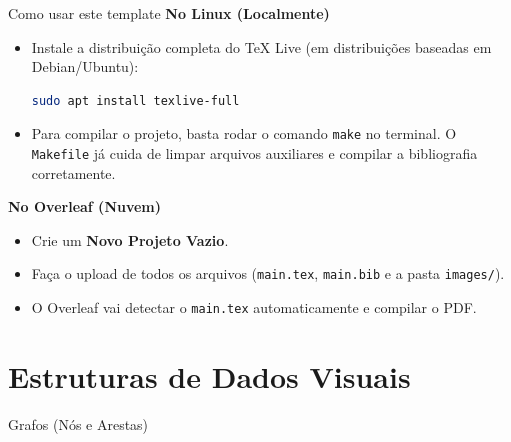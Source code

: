 \documentclass[utf8, aspectratio=169]{beamer}
\begin{document}
\begin{frame}[fragile]{Como usar este template}
  \textbf{No Linux (Localmente)}
  \begin{itemize}
    \item Instale a distribuição completa do TeX Live (em distribuições baseadas em Debian/Ubuntu):
    \begin{lstlisting}[language=bash, numbers=none, xleftmargin=0em, framexleftmargin=0em]
sudo apt install texlive-full
    \end{lstlisting}
    \item Para compilar o projeto, basta rodar o comando \texttt{make} no terminal. O \texttt{Makefile} já cuida de limpar arquivos auxiliares e compilar a bibliografia corretamente.
  \end{itemize}

  \vspace{0.3cm}
  \textbf{No Overleaf (Nuvem)}
  \begin{itemize}
    \item Crie um \textbf{Novo Projeto Vazio}.
    \item Faça o upload de todos os arquivos (\texttt{main.tex}, \texttt{main.bib} e a pasta \texttt{images/}).
    \item O Overleaf vai detectar o \texttt{main.tex} automaticamente e compilar o PDF.
  \end{itemize}
\end{frame}

\section{Estruturas de Dados Visuais}

\begin{frame}{Grafos (Nós e Arestas)}
  \begin{center}
  \end{center}
\end{frame}
\end{document}
